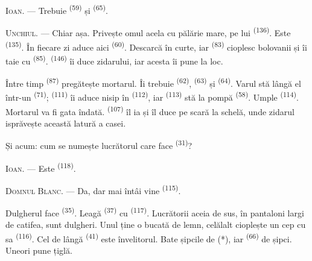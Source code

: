 \textsc{Ioan}. --- Trebuie  \textsuperscript{(59)} și
 \textsuperscript{(65)}.

\textsc{Unchiul}. --- Chiar așa. Privește omul acela cu pălărie mare, pe
 lui \textsuperscript{(136)}. Este 
\textsuperscript{(135)}. În fiecare zi aduce aici 
\textsuperscript{(60)}. Descarcă în curte, iar 
\textsuperscript{(83)} cioplesc bolovanii și îi taie cu  \textsuperscript{(85)}. 
\textsuperscript{(146)} îi duce zidarului, iar acesta îi pune la loc.

Între timp  \textsuperscript{(87)} pregătește mortarul. Îi
trebuie  \textsuperscript{(62)}, 
\textsuperscript{(63)} și  \textsuperscript{(64)}. Varul stă lângă el
într-un  \textsuperscript{(71)}; 
\textsuperscript{(111)} îi aduce nisip în  \textsuperscript{(112)},
iar  \textsuperscript{(113)} stă la pompă
\textsuperscript{(58)}. Umple  \textsuperscript{(114)}. Mortarul va
fi gata îndată.  \textsuperscript{(107)} îl ia și îl duce pe
scară la schelă, unde zidarul isprăvește această latură a casei.

Și acum: cum se numește lucrătorul care face 
\textsuperscript{(31)}?

\textsc{Ioan}. --- Este  \textsuperscript{(118)}.

\VUsaut{3.0mm}
\VUsaut{3.0mm}

\textsc{Domnul Blanc}. --- Da, dar mai întâi vine 
\textsuperscript{(115)}.

Dulgherul face  \textsuperscript{(35)}. Leagă 
\textsuperscript{(37)} cu  \textsuperscript{(117)}. Lucrătorii
aceia de sus, în pantaloni largi de catifea, sunt dulgheri. Unul ține o bucată de
lemn, celălalt cioplește un cep cu  sa \textsuperscript{(116)}. Cel
de lângă  \textsuperscript{(41)} este învelitorul. Bate șipcile de
 (*), iar  \textsuperscript{(66)} de șipci. Uneori
pune țiglă.



